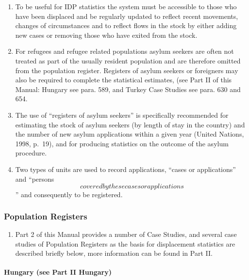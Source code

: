 \documentclass[
]{article}
\providecommand{\tightlist}{%
  \setlength{\itemsep}{0pt}\setlength{\parskip}{0pt}}
\begin{document}
\begin{enumerate}
\def\labelenumi{\arabic{enumi}.}
\setcounter{enumi}{153}
\item
  To be useful for IDP statistics the system must be accessible to
  those who have been displaced and be regularly updated to reflect
  recent movements, changes of circumstances and to reflect flows in
  the stock by either adding new cases or removing those who have
  exited from the stock.
\item
  For refugees and refugee related populations asylum seekers are
  often not treated as part of the usually resident population and are
  therefore omitted from the population register. Registers of asylum
  seekers or foreigners may also be required to complete the
  statistical estimates, (see Part II of this Manual: Hungary see
  para. 589, and Turkey Case Studies see para. 630 and 654.
\item
  The use of ``registers of asylum seekers'' is specifically
  recommended for estimating the stock of asylum seekers (by length of
  stay in the country) and the number of new asylum applications
  within a given year (United Nations, 1998, p.~19), and for producing
  statistics on the outcome of the asylum procedure.
\item
  Two types of units are used to record applications, ``cases or
  applications'' and ``persons \[covered by these cases or
      applications\]'' and consequently to be registered.
\end{enumerate}

\hypertarget{c.1.-population-registers}{%
\subsubsection{Population Registers}\label{c.1.-population-registers}}

\begin{enumerate}
\def\labelenumi{\arabic{enumi}.}
\setcounter{enumi}{157}
\tightlist
\item
  Part 2 of this Manual provides a number of Case Studies, and
  several case studies of Population Registers as the basis for
  displacement statistics are described briefly below, more
  information can be found in Part II.
\end{enumerate}

\hypertarget{hungary-see-part-ii-hungary-1}{%
\paragraph{Hungary (see Part II Hungary)}\label{hungary-see-part-ii-hungary-1}}
\end{document}
